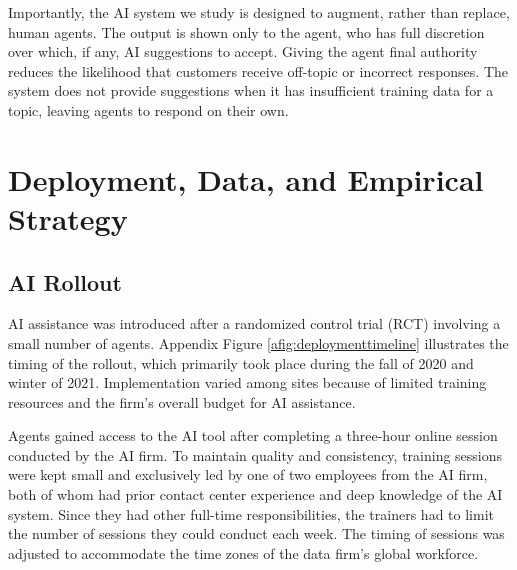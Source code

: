 \documentclass[11pt]{article}
\begin{document}

Importantly, the AI system we study is designed to augment, rather than replace, human agents. The output is shown only to the agent, who has full discretion over which, if any, AI suggestions to accept. Giving the agent final authority reduces the likelihood that customers receive off-topic or incorrect responses.  The system does not provide suggestions when it has insufficient training data for a topic, leaving agents to respond on their own. 


\section{Deployment, Data, and Empirical Strategy}

\subsection{AI Rollout}\label{sec:rollout}  
AI assistance was introduced after a randomized control trial (RCT) involving a small number of agents. Appendix Figure \ref{afig:deploymenttimeline} illustrates the timing of the rollout, which primarily took place during the fall of 2020 and winter of 2021. Implementation varied among sites because of limited training resources and the firm's overall budget for AI assistance.

Agents gained access to the AI tool after completing a three-hour online  session conducted by the AI firm. To maintain quality and consistency, training sessions were kept small and exclusively led by one of two employees from the AI firm, both of whom had prior contact center experience and deep knowledge of the AI system. Since they had other full-time responsibilities, the trainers had to limit the number of sessions they could conduct each week. The timing of sessions was adjusted to accommodate the time zones of the data firm's global workforce.
\end{document}
